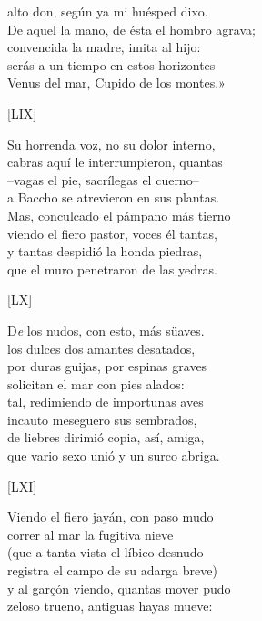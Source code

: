 \documentclass[11pt,a4paper,twoside]{article}
\begin{document}
alto don, según ya mi huésped dixo.\\
De aquel la mano, de ésta el hombro agrava;\\
convencida la madre, imita al hijo:\\
serás a un tiempo en estos horizontes\\
Venus del mar, Cupido de los montes.»\par\pend
%
\begin{center}
	[LIX]
\end{center}\pstart
Su horrenda voz, no su dolor interno,\\
cabras aquí le interrumpieron, quantas\\
--vagas el pie, sacrílegas el cuerno--\\
a Baccho se atrevieron en sus plantas.\\
Mas, conculcado el pámpano más tierno\\
viendo el fiero pastor, voces él tantas,\\
y tantas despidió la honda piedras,\\
que el muro penetraron de las yedras.\par\pend
%
\begin{center}
	[LX]
\end{center}\pstart
D\textit{e} los nudos, con esto, más süaves.\\
los dulces dos amantes desatados,\\
por duras guijas, por espinas graves\\
solicitan el mar con pies alados:\\
tal, redimiendo de importunas aves\\
incauto meseguero sus sembrados,\\
de liebres dirimió copia, así, amiga,\\
que vario sexo unió y un surco abriga.\par\pend
%
\begin{center}
	[LXI]
\end{center}\pstart
Viendo el fiero jayán, con paso mudo\\
correr al mar la fugitiva nieve\\
(que a tanta vista el líbico desnudo\\
registra el campo de su adarga breve)\\
y al garçón viendo, quantas mover pudo\\
zeloso trueno, antiguas hayas mueve:\\
\end{document}
